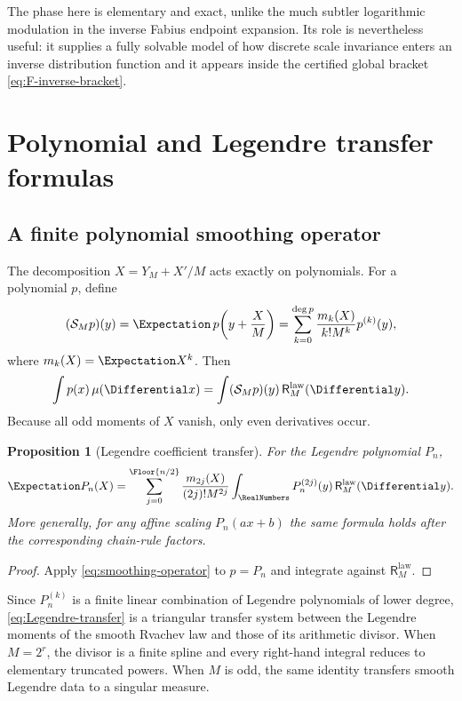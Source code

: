 \documentclass[11pt,oneside]{article}
\newtheorem{proposition}[theorem]{Proposition}
\theoremstyle{definition}
\theoremstyle{remark}
\newcommand{\ReciprocalIntegerLaw}[1]{\mathsf R^{\mathrm{law}}_{#1}}
\begin{document}
The phase here is elementary and exact, unlike the much subtler logarithmic modulation in
the inverse Fabius endpoint expansion.  Its role is nevertheless useful: it supplies a fully
solvable model of how discrete scale invariance enters an inverse distribution function and
it appears inside the certified global bracket \eqref{eq:F-inverse-bracket}.

\section{Polynomial and Legendre transfer formulas}
\label{sec:legendre}

\subsection{A finite polynomial smoothing operator}

The decomposition $X=Y_M+X'/M$ acts exactly on polynomials.  For a polynomial $p$, define
\begin{equation}
 (\mathcal S_Mp)(y)
 =\Expectation\,p\!\left(y+\frac XM\right)
 =\sum_{k=0}^{\deg p}\frac{m_k(X)}{k!M^k}p^{(k)}(y),
 \label{eq:smoothing-operator}
\end{equation}
where $m_k(X)=\Expectation X^k$.  Then
\begin{equation}
 \int p(x)\,\mu(\Differential x)
 =\int (\mathcal S_Mp)(y)\,\ReciprocalIntegerLaw{M}(\Differential y).
 \label{eq:polynomial-transfer}
\end{equation}
Because all odd moments of $X$ vanish, only even derivatives occur.

\begin{proposition}[Legendre coefficient transfer]
\label{prop:Legendre-transfer}
For the Legendre polynomial $P_n$,
\begin{equation}
 \Expectation P_n(X)
 =\sum_{j=0}^{\Floor{n/2}}
 \frac{m_{2j}(X)}{(2j)!M^{2j}}
 \int_{\RealNumbers}P_n^{(2j)}(y)\,\ReciprocalIntegerLaw{M}(\Differential y).
 \label{eq:Legendre-transfer}
\end{equation}
More generally, for any affine scaling $P_n(ax+b)$ the same formula holds after the
corresponding chain-rule factors.
\end{proposition}

\begin{proof}
Apply \eqref{eq:smoothing-operator} to $p=P_n$ and integrate against $\ReciprocalIntegerLaw{M}$.
\end{proof}

Since $P_n^{(k)}$ is a finite linear combination of Legendre polynomials of lower degree,
\eqref{eq:Legendre-transfer} is a triangular transfer system between the Legendre moments
of the smooth Rvachev law and those of its arithmetic divisor.  When $M=2^r$, the divisor
is a finite spline and every right-hand integral reduces to elementary truncated powers.
When $M$ is odd, the same identity transfers smooth Legendre data to a singular measure.
\end{document}
